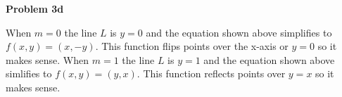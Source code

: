 \documentclass[fleqn]{article}
\newcommand{\problem}[1]{\large\textbf{Problem #1}\normalsize}
\begin{document}
\problem{3d}

When $m = 0$ the line $L$ is $y = 0$ and the equation shown above simplifies to $f(x, y) = (x, -y)$. This
function flips points over the x-axis or $y = 0$ so it makes sense. When $m = 1$ the line $L$ is
$y = 1$ and the equation shown above simlifies to $f(x, y) = (y, x)$. This
function reflects points over $y = x$ so it makes sense.
\end{document}
